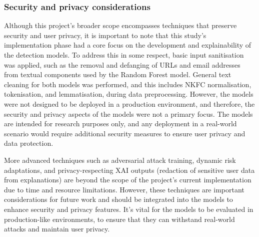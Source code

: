 
\subsubsection{Security and privacy considerations}
Although this project's broader scope encompasses techniques that preserve security and user privacy, it is important to note that this study's implementation phase had a core focus on the development and explainability of the detection models. To address this in some respect, basic input sanitisation was applied, such as the removal and defanging of URLs and email addresses from textual components used by the Random Forest model. General text cleaning for both models was performed, and this includes NKFC normalisation, tokenisation, and lemmatisation, during data preprocessing. However, the models were not designed to be deployed in a production environment, and therefore, the security and privacy aspects of the models were not a primary focus. The models are intended for research purposes only, and any deployment in a real-world scenario would require additional security measures to ensure user privacy and data protection.\newline

\noindent More advanced techniques such as adversarial attack training, dynamic risk adaptations, and privacy-respecting XAI outputs (redaction of sensitive user data from explanations) are beyond the scope of the project's current implementation due to time and resource limitations. However, these techniques are important considerations for future work and should be integrated into the models to enhance security and privacy features. It's vital for the models to be evaluated in production-like environments, to ensure that they can withstand real-world attacks and maintain user privacy.
